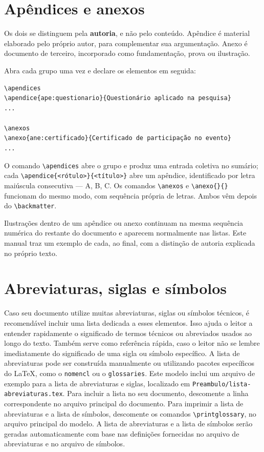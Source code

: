 \section{Apêndices e anexos}\label{sec:apendices-anexos}

Os dois se distinguem pela \textbf{autoria}, e não pelo conteúdo. Apêndice é material elaborado pelo
próprio autor, para complementar sua argumentação. Anexo é documento de terceiro, incorporado como
fundamentação, prova ou ilustração.

Abra cada grupo uma vez e declare os elementos em seguida:

\begin{Verbatim}[fontsize=\small]
\apendices
\apendice{ape:questionario}{Questionário aplicado na pesquisa}
...

\anexos
\anexo{ane:certificado}{Certificado de participação no evento}
...
\end{Verbatim}

O comando \verb|\apendices| abre o grupo e produz uma entrada coletiva no sumário; cada
\verb|\apendice{<rótulo>}{<título>}| abre um apêndice, identificado por letra maiúscula consecutiva
--- A, B, C. Os comandos \verb|\anexos| e \verb|\anexo{}{}| funcionam do mesmo modo, com sequência
própria de letras. Ambos vêm depois do \verb|\backmatter|.

Ilustrações dentro de um apêndice ou anexo continuam na mesma sequência numérica do restante do
documento e aparecem normalmente nas listas. Este manual traz um exemplo de cada, ao final, com a
distinção de autoria explicada no próprio texto.

\section{Abreviaturas, siglas e símbolos}\label{sec:abreviaturas-siglas-simbolos}

Caso seu documento utilize muitas abreviaturas, siglas ou símbolos técnicos, é recomendável incluir
uma lista dedicada a esses elementos. Isso ajuda o leitor a entender rapidamente o significado de
termos técnicos ou abreviados usados ao longo do texto. Também serve como referência rápida, caso o
leitor não se lembre imediatamente do significado de uma sigla ou símbolo específico. A lista de
abreviaturas pode ser construída manualmente ou utilizando pacotes específicos do \LaTeX, como o
\texttt{nomencl} ou o \texttt{glossaries}. Este modelo inclui um arquivo de exemplo para a lista de
abreviaturas e siglas, localizado em \texttt{Preambulo/lista-abreviaturas.tex}. Para
incluir a lista no seu documento, descomente a linha correspondente no arquivo principal do
documento. Para imprimir a lista de abreviaturas e a lista de símbolos, descomente os comandos
\verb|\printglossary|, no arquivo principal do modelo. A lista de abreviaturas e a lista de símbolos
serão geradas automaticamente com base nas definições fornecidas no arquivo de abreviaturas e no
arquivo de símbolos.

